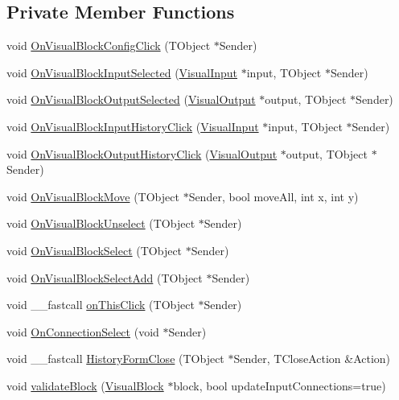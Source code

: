 \subsection*{Private Member Functions}
\begin{CompactItemize}
\item 
void \hyperlink{classPIWOEngine_97f4f39393b6fc49fe33b867b46b9564}{OnVisualBlockConfigClick} (TObject $\ast$Sender)
\item 
void \hyperlink{classPIWOEngine_4e51d927289a1bcb9dc8f1153d457e93}{OnVisualBlockInputSelected} (\hyperlink{classVisualInput}{VisualInput} $\ast$input, TObject $\ast$Sender)
\item 
void \hyperlink{classPIWOEngine_0b7e4c9ee82bab94f35d8cc5f6cda3f7}{OnVisualBlockOutputSelected} (\hyperlink{classVisualOutput}{VisualOutput} $\ast$output, TObject $\ast$Sender)
\item 
void \hyperlink{classPIWOEngine_1a54c292b17426a1690de0500a72d8fa}{OnVisualBlockInputHistoryClick} (\hyperlink{classVisualInput}{VisualInput} $\ast$input, TObject $\ast$Sender)
\item 
void \hyperlink{classPIWOEngine_32a93f8cc49a3c9988674e99765d9cee}{OnVisualBlockOutputHistoryClick} (\hyperlink{classVisualOutput}{VisualOutput} $\ast$output, TObject $\ast$Sender)
\item 
void \hyperlink{classPIWOEngine_07f70dcb30a6077266626c7f52ce1667}{OnVisualBlockMove} (TObject $\ast$Sender, bool moveAll, int x, int y)
\item 
void \hyperlink{classPIWOEngine_2baa1b7c8bb6b91e413b8cc2a7f5b8ea}{OnVisualBlockUnselect} (TObject $\ast$Sender)
\item 
void \hyperlink{classPIWOEngine_94a545e2d82c78fffc68c79f53db4a72}{OnVisualBlockSelect} (TObject $\ast$Sender)
\item 
void \hyperlink{classPIWOEngine_7ec3c8295c1984c7661c813881fb5bda}{OnVisualBlockSelectAdd} (TObject $\ast$Sender)
\item 
void \_\-\_\-fastcall \hyperlink{classPIWOEngine_c0f3009bc8be06d0242546f8a2e6fc94}{onThisClick} (TObject $\ast$Sender)
\item 
void \hyperlink{classPIWOEngine_1a8f4608620d249e9982004773bf1fe9}{OnConnectionSelect} (void $\ast$Sender)
\item 
void \_\-\_\-fastcall \hyperlink{classPIWOEngine_deb8c8ae4c4d5f69c242f222dc2557bb}{HistoryFormClose} (TObject $\ast$Sender, TCloseAction \&Action)
\item 
void \hyperlink{classPIWOEngine_9e8cffc64037b892fbdb1daf3459a31d}{validateBlock} (\hyperlink{classVisualBlock}{VisualBlock} $\ast$block, bool updateInputConnections=true)

\end{CompactItemize}
